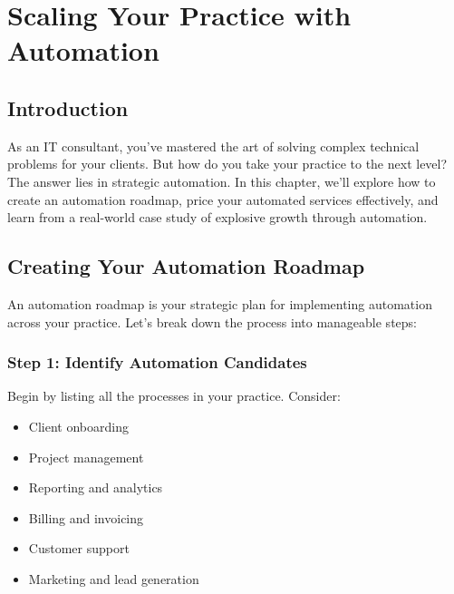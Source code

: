 \chapter{Scaling Your Practice with Automation}

\section{Introduction}

As an IT consultant, you've mastered the art of solving complex technical problems for your clients. But how do you take your practice to the next level? The answer lies in strategic automation. In this chapter, we'll explore how to create an automation roadmap, price your automated services effectively, and learn from a real-world case study of explosive growth through automation.

\section{Creating Your Automation Roadmap}

An automation roadmap is your strategic plan for implementing automation across your practice. Let's break down the process into manageable steps:

\subsection{Step 1: Identify Automation Candidates}

Begin by listing all the processes in your practice. Consider:
\begin{itemize}
    \item Client onboarding
    \item Project management
    \item Reporting and analytics
    \item Billing and invoicing
    \item Customer support
    \item Marketing and lead generation
\end{itemize}


